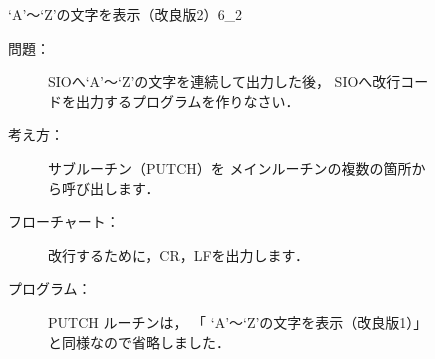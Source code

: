 \begin{figure}[btp]
\begin{reidai}{`A'〜`Z'の文字を表示（改良版2）}{6_2}
\begin{description}
\item[問題：] SIOへ`A'〜`Z'の文字を連続して出力した後，
SIOへ改行コードを出力するプログラムを作りなさい．

\item[考え方：]
サブルーチン（PUTCH）を
メインルーチンの複数の箇所から呼び出します．

\item[フローチャート：]
改行するために，CR，LFを出力します．

\begin{center}
\end{center}

\item[プログラム：]
PUTCH ルーチンは，
「 `A'〜`Z'の文字を表示（改良版1）」と同様なので省略しました．


\end{description}
\end{reidai}
\end{figure}
